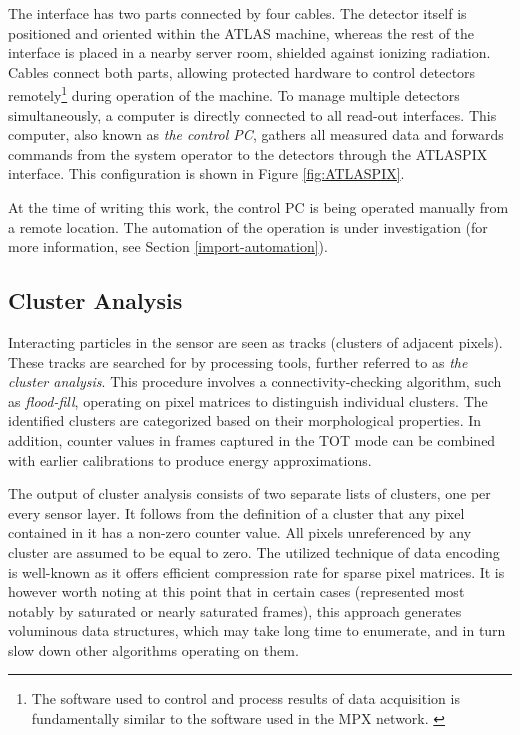 The interface has two parts connected by four cables. The detector itself is positioned and oriented within the ATLAS machine, whereas the rest of the interface is placed in a nearby server room, shielded against ionizing radiation. Cables connect both parts, allowing protected hardware to control detectors remotely\footnote{The software used to control and process results of data acquisition is fundamentally similar to the software used in the MPX network. \cite{ProcessingSoftware}} during operation of the machine. To manage multiple detectors simultaneously, a computer is directly connected to all read-out interfaces. This computer, also known as \textit{the control PC}, gathers all measured data and forwards commands from the system operator to the detectors through the ATLASPIX interface. This configuration is shown in Figure \ref{fig:ATLASPIX}.

At the time of writing this work, the control PC is being operated manually from a remote location. The automation of the operation is under investigation (for more information, see Section \ref{import-automation}).

\subsection{Cluster Analysis}
\label{intro:cluster-analysis}
Interacting particles in the sensor are seen as tracks (clusters of adjacent pixels). These tracks are searched for by processing tools, further referred to as \textit{the cluster analysis}. \cite{PatternRecognition} This procedure involves a connectivity-checking algorithm, such as \textit{flood-fill}, operating on pixel matrices to distinguish individual clusters. The identified clusters are categorized based on their morphological properties. In addition, counter values in frames captured in the TOT mode can be combined with earlier calibrations to produce energy approximations. \cite{EnergyCalibration}

The output of cluster analysis consists of two separate lists of clusters, one per every sensor layer. It follows from the definition of a cluster that any pixel contained in it has a non-zero counter value. All pixels unreferenced by any cluster are assumed to be equal to zero. The utilized technique of data encoding is well-known as it offers efficient compression rate for sparse pixel matrices. It is however worth noting at this point that in certain cases (represented most notably by saturated or nearly saturated frames), this approach generates voluminous data structures, which may take long time to enumerate, and in turn slow down other algorithms operating on them.

